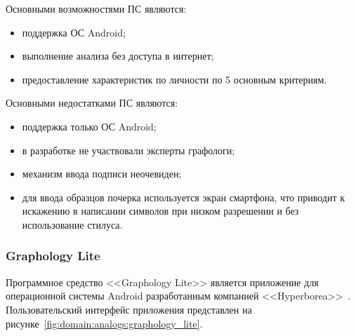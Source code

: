 Основными возможностями ПС являются:
\begin{itemize}
  \item поддержка ОС Android;
  \item выполнение анализа без доступа в интернет;
  \item предоставление характеристик по личности по 5 основным критериям.
\end{itemize}

Основными недостатками ПС являются:
\begin{itemize}
  \item поддержка только ОС Android;
  \item в разработке не участвовали эксперты графологи;
  \item механизм ввода подписи неочевиден;
  \item для ввода образцов почерка используется экран смартфона, что приводит к искажению в написании символов при низком разрешении и без использование стилуса.
\end{itemize}

\subsubsection{Graphology Lite}
\label{sub:domain:analogs:graphology_lite}

Программное средство <<Graphology Lite>> является приложение для операционной системы Android разработанным компанией <<Hyperborea>>~\cite{analogs_graphology_lite}. Пользовательский интерфейс приложения представлен на рисунке~\ref{fig:domain:analogs:graphology_lite}.

